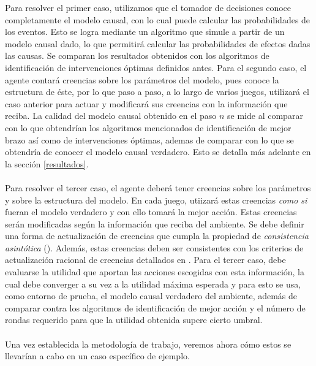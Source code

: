 \documentclass[11pt]{article}
\theoremstyle{plain}
\begin{document}
\indent Para resolver el primer caso, utilizamos que el tomador de decisiones conoce completamente el modelo causal, con lo cual puede calcular las probabilidades de los eventos. Esto se logra mediante un algoritmo que simule a partir de un modelo causal dado, lo que permitirá calcular las probabilidades de efectos dadas las causas. Se comparan los resultados obtenidos con los algoritmos de identificación de intervenciones óptimas definidos antes. Para el segundo caso, el agente contará creencias sobre los parámetros del modelo, pues conoce la estructura de éste, por lo que paso a paso, a lo largo de varios juegos, utilizará el caso anterior para actuar y modificará sus creencias con la información que reciba. La calidad del modelo causal obtenido en el paso $n$ se mide al comparar con lo que obtendrían los algoritmos mencionados de identificación de mejor brazo así como de intervenciones óptimas, ademas de comparar con lo que se obtendría de conocer el modelo causal verdadero. Esto se detalla más adelante en la sección \ref{resultados}.\\
\\
\indent Para resolver el tercer caso, el agente deberá tener creencias sobre los parámetros y sobre la estructura del modelo. En cada juego, utiizará estas creencias \textit{como si} fueran el modelo verdadero y con ello tomará la mejor acción. Estas creencias serán modificadas según la información que reciba del ambiente. Se debe definir una forma de actualización de creencias que cumpla la propiedad de \textit{consistencia asintótica} (\cite{ghosal2017fundamentals}). Además, estas creencias deben ser consistentes con los criterios de actualización racional de creencias detallados en \cite{shoham2008multiagent}. Para el tercer caso, debe evaluarse la utilidad que aportan las acciones escogidas con esta información, la cual debe converger a su vez a la utilidad máxima esperada y para esto se usa, como entorno de prueba, el modelo causal verdadero del ambiente, además de comparar contra los algoritmos de identificación de mejor acción y el número de rondas requerido para que la utilidad obtenida supere cierto umbral.\\
\\
\indent Una vez establecida la metodología de trabajo, veremos ahora cómo estos se llevarían a cabo en un caso específico de ejemplo.
\end{document}
